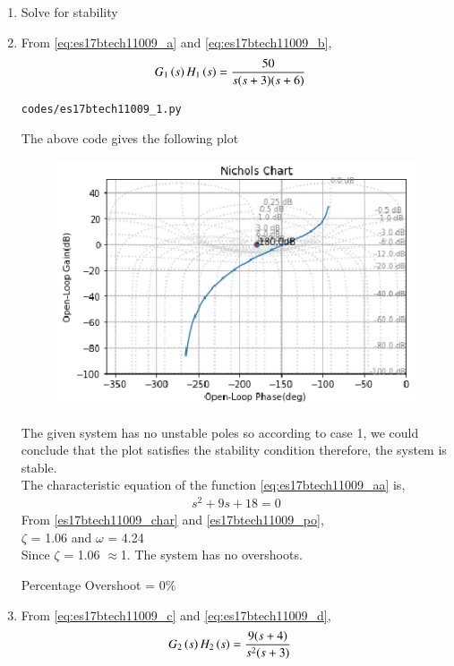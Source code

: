 \begin{enumerate}[label=\thesection.\arabic*.,ref=\thesection.\theenumi]
\item Solve for stability
\item
\solution From \eqref{eq:es17btech11009_a} and \eqref{eq:es17btech11009_b},
\begin{align}
G_1\brak{s}H_1\brak{s}&= \frac{50}{s(s+3)(s+6)}
\label{eq:es17btech11009_aa}
\end{align}
\begin{lstlisting}
codes/es17btech11009_1.py
\end{lstlisting}

The above code gives the following plot

\begin{figure}[!h]
\centering
\includegraphics[width=\columnwidth]{./figs/es17btech11009_1.eps}
\caption{}
\label{fig:es17btech11009_fig1}
\end{figure}
The given system has no unstable poles so according to case 1, we could conclude that the plot satisfies the stability condition therefore, the system is stable.
\\
The characteristic equation of the function \eqref{eq:es17btech11009_aa} is,
\begin{align}
 s^2 + 9s + 18 = 0
 \end{align}
From \eqref{es17btech11009_char} and \eqref{es17btech11009_po},
\\
  $\zeta$ = 1.06 and $\omega$ = 4.24
  \\
  Since $\zeta$ = 1.06 $\approx$1.
  The system has no overshoots.
  
  Percentage Overshoot = 0\%
\\
\item
From \eqref{eq:es17btech11009_c} and \eqref{eq:es17btech11009_d},
\begin{align}
G_2\brak{s}H_2\brak{s}&= \frac{9(s+4)}{s^2(s+3)}
\label{eq:es17btech11009_bb}
\end{align}


\end{enumerate}
